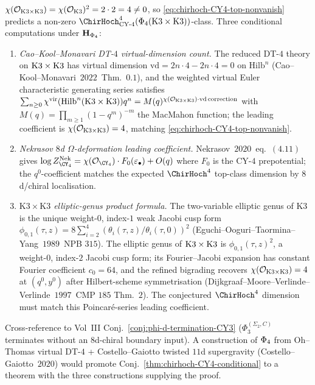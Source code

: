 \begin{remark}
$\chi(\mathcal O_{\mathrm{K3}\times\mathrm{K3}})=\chi(\mathcal O_{\mathrm{K3}})^2=2\cdot 2=4\ne 0$,
so \eqref{eq:chirhoch-CY4-top-nonvanish} predicts a non-zero
$\ChirHoch^4_{\CYfour}(\PhiFour(\KKX))$-class. Three
conditional computations under $\mathbf H_{\Phi_{4}}$:
\begin{enumerate}[label=\textup{(V\arabic*)}]
\item \emph{Cao--Kool--Monavari DT-$4$ virtual-dimension count.}
 The reduced DT-$4$ theory on $\mathrm{K3}\times\mathrm{K3}$ has virtual
 dimension $\mathrm{vd}=2n\cdot 4-2n\cdot 4=0$ on $\mathrm{Hilb}^n$
 (Cao--Kool--Monavari~$2022$~Thm.\ $0.1$), and the weighted virtual
 Euler characteristic generating series satisfies
 $\sum_{n\ge 0}\chi^{\mathrm{vir}}(\mathrm{Hilb}^n(\mathrm{K3}\times\mathrm{K3}))q^n=
 M(q)^{\chi(\mathcal O_{\mathrm{K3}\times\mathrm{K3}})\cdot\mathrm{vd\,correction}}$
 with $M(q)=\prod_{m\ge 1}(1-q^m)^{-m}$ the MacMahon function; the
 leading coefficient is $\chi(\mathcal O_{\mathrm{K3}\times\mathrm{K3}})=4$, matching
 \eqref{eq:chirhoch-CY4-top-nonvanish}.
\item \emph{Nekrasov $8$d $\Omega$-deformation leading coefficient.}
 Nekrasov~$2020$~eq.\ $(4.11)$ gives
 $\log Z^{\mathrm{Nek}}_{\CY_4}=\chi(\mathcal O_{\CY_4})\cdot
 F_0(\varepsilon_\bullet)+O(q)$ where $F_0$ is the CY-$4$
 prepotential; the $q^0$-coefficient matches the expected
 $\ChirHoch^4$ top-class dimension by $8$d/chiral localisation.
\item \emph{$\mathrm{K3}\times\mathrm{K3}$ elliptic-genus product
 formula.} The two-variable elliptic genus of K3 is the unique
 weight-$0$, index-$1$ weak Jacobi cusp form
 $\phi_{0,1}(\tau,z)=8\sum_{i=2}^{4}(\theta_i(\tau,z)/\theta_i(\tau,0))^2$
 (Eguchi--Ooguri--Taormina--Yang~$1989$~NPB $315$). The elliptic genus
 of $\mathrm{K3}\times\mathrm{K3}$ is $\phi_{0,1}(\tau,z)^2$, a weight-$0$, index-$2$
 Jacobi cusp form; its Fourier--Jacobi expansion has constant
 Fourier coefficient $c_0=64$, and the refined bigrading recovers
 $\chi(\mathcal O_{\mathrm{K3}\times\mathrm{K3}})=4$ at $(q^0,y^0)$ after Hilbert-scheme
 symmetrisation (Dijkgraaf--Moore--Verlinde--Verlinde~$1997$~CMP
 $185$ Thm.\ $2$). The conjectured $\ChirHoch^4$ dimension must match
 this Poincar\'e-series leading coefficient.
\end{enumerate}
Cross-reference to Vol~III
Conj.~\textup{\ref{conj:phi-d-termination-CY3}}
\textup{(}$\Phi_3^{(\Sigma_2,C)}$ terminates without an
$8$d-chiral boundary input\textup{)}. A construction of $\Phi_{4}$
from Oh--Thomas virtual DT-$4$ +
Costello--Gaiotto twisted $11$d supergravity
(Costello--Gaiotto~$2020$) would promote
Conj.~\textup{\ref{thm:chirhoch-CY4-conditional}} to a theorem with
the three constructions supplying the proof.
\end{remark}

